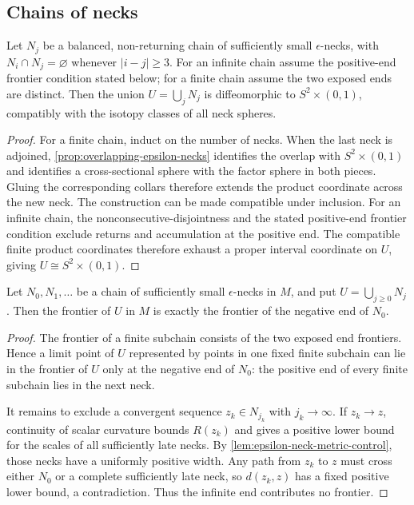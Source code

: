 \subsection{Chains of necks}

\begin{lemma}
\label{lem:neck-chain-product}
\notready
Let $N_j$ be a balanced, non-returning chain of sufficiently small
$\epsilon$-necks, with $N_i\cap N_j=\varnothing$ whenever
$|i-j|\ge3$.  For an infinite chain assume the positive-end frontier
condition stated below; for a finite chain assume
the two exposed ends are distinct.  Then the union
$U=\bigcup_jN_j$ is diffeomorphic to $S^2\times(0,1)$, compatibly with the
isotopy classes of all neck spheres.
\end{lemma}

\begin{proof}
For a finite chain, induct on the number of necks.  When the last neck is
adjoined, \ref{prop:overlapping-epsilon-necks} identifies the overlap with
$S^2\times(0,1)$ and identifies a cross-sectional sphere with the factor
sphere in both pieces.  Gluing the corresponding collars therefore extends
the product coordinate across the new neck.  The construction can be made
compatible under inclusion.  For an infinite chain, the
nonconsecutive-disjointness and the stated positive-end frontier condition
exclude returns and
accumulation at the positive end.  The compatible finite product coordinates
therefore exhaust a proper interval coordinate on $U$, giving
$U\cong S^2\times(0,1)$.
\end{proof}

\begin{lemma}
\label{lem:infinite-neck-chain-frontier}
\notready
Let $N_0,N_1,\ldots$ be a chain of sufficiently small
$\epsilon$-necks in $M$, and put $U=\bigcup_{j\ge0}N_j$.  Then the
frontier of $U$ in $M$ is exactly the frontier of the negative end of
$N_0$.
\end{lemma}

\begin{proof}
The frontier of a finite subchain consists of the two exposed end
frontiers.  Hence a limit point of $U$ represented by points in one fixed
finite subchain can lie in the frontier of $U$ only at the negative end of
$N_0$: the positive end of every finite subchain lies in the next neck.

It remains to exclude a convergent sequence $z_k\in N_{j_k}$ with
$j_k\to\infty$.  If $z_k\to z$, continuity of scalar curvature bounds
$R(z_k)$ and gives a positive lower bound for the scales of all sufficiently
late necks.  By \ref{lem:epsilon-neck-metric-control}, those necks have a
uniformly positive width.  Any path from $z_k$ to $z$ must cross either
$N_0$ or a complete sufficiently late neck, so $d(z_k,z)$ has a fixed
positive lower bound, a contradiction.  Thus the infinite end contributes
no frontier.
\end{proof}

